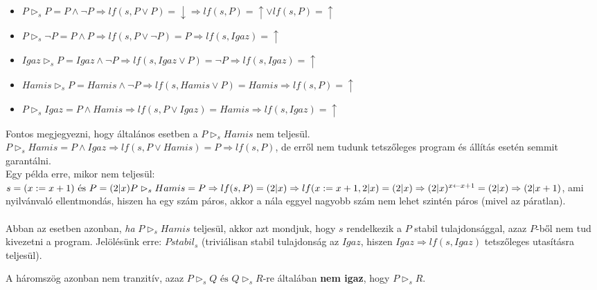 \documentclass[12pt]{article}
\begin{document}
\begin{itemize}
	\item $P \vartriangleright_s P = P \land \neg P \Rightarrow lf(s,P \lor P) = \downarrow \Rightarrow lf(s,P) = \uparrow \lor lf(s,P) = \uparrow$
	\item $P \vartriangleright_s \neg P = P \land P \Rightarrow lf(s,P \lor \neg P) = P \Rightarrow lf(s,Igaz) = \uparrow$
	\item $Igaz \vartriangleright_s P = Igaz \land \neg P \Rightarrow lf(s,Igaz \lor P) = \neg P \Rightarrow lf(s,Igaz) = \uparrow$
	\item $Hamis \vartriangleright_s P = Hamis \land \neg P \Rightarrow lf(s, Hamis \lor P) = Hamis \Rightarrow lf(s,P) = \uparrow$
	\item $P \vartriangleright_s Igaz = P \land Hamis \Rightarrow lf(s,P \lor Igaz) = Hamis \Rightarrow lf(s,Igaz) = \uparrow$
	
\end{itemize}
Fontos megjegyezni, hogy általános esetben a $P \vartriangleright_s Hamis$ nem teljesül.\\
$P \vartriangleright_s Hamis = P \land Igaz \Rightarrow lf(s,P \lor Hamis) = P \Rightarrow lf(s,P)$, de erről nem tudunk tetszőleges program és állítás esetén semmit garantálni.\\
Egy példa erre, mikor nem teljesül:\\
$s = (x := x+1) \text{ és } P = (2|x) \\
P \vartriangleright_s Hamis = P \Rightarrow lf(s,P) = (2|x) \Rightarrow lf(x:=x+1, 2|x) = (2|x) \Rightarrow (2|x)^{x \leftarrow x+1} = (2|x) \Rightarrow (2|x+1) $, ami nyilvánvaló ellentmondás, hiszen ha egy szám páros, akkor a nála eggyel nagyobb szám nem lehet szintén páros (mivel az páratlan).
\paragraph{}Abban az esetben azonban, \textit{ha} $P \vartriangleright_s Hamis$ teljesül, akkor azt mondjuk, hogy $s$ rendelkezik a $P$ stabil tulajdonsággal, azaz $P$-ből nem tud kivezetni a program. Jelölésünk erre: $P stabil_s$ (triviálisan stabil tulajdonság az $Igaz$, hiszen $Igaz \Rightarrow lf(s,Igaz)$ tetszőleges utasításra teljesül).

A háromszög azonban nem tranzitív, azaz $ P \vartriangleright_s Q \text{ és } Q \vartriangleright_s R$-re általában \textbf{nem igaz}, hogy $P \vartriangleright_s R$.
\end{document}
